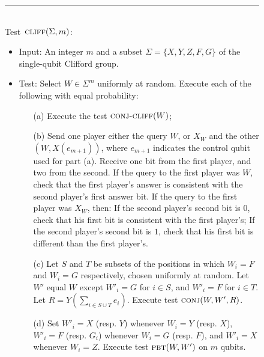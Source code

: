 \begin{figure}[H]
\rule[1ex]{\textwidth}{0.5pt}\\
Test~$\textsc{cliff}(\Sigma,m)$:
\begin{itemize}
    \item Input: An integer $m$ and a subset $\Sigma = \{X,Y,Z,F,G\}$ of the single-qubit Clifford group. 
    \item Test: Select $W \in \Sigma^m$ uniformly at random. Execute each of the following with equal probability:
\begin{enumerate}
\item[(a)] Execute the test $\textsc{conj-cliff}(W)$;
\item[(b)] Send one player either the query $W$, or $X_W$ and the other $(W,X(e_{m+1}))$, where $e_{m+1}$ indicates the control qubit used for part (a). Receive one bit from the first player, and two from the second. If the query to the first player was $W$, check that the first player's answer is consistent with the second player's first answer bit. If the query to the first player was $X_W$, then: If the second player's second bit is $0$, check that his first bit is consistent with the first player's; If the second player's second bit is $1$, check that his first bit is different than the first player's.
\item[(c)] Let $S$ and $T$ be subsets of the positions in which $W_i=F$ and $W_i=G$ respectively, chosen uniformly at random. Let $W'$ equal $W$ except $W'_i=G$ for $i\in S$, and $W'_i=F$ for $i\in T$. Let  $R = Y(\sum_{i\in S\cup T} e_i)$. Execute test $\textsc{conj}(W,W', R)$.
\item[(d)] Set $W'_i = X$ (resp. $Y$) whenever $W_i = Y$ (resp. $X$), $W'_i = F$ (resp. $G_i$) whenever $W_i = G$ (resp. $F$), and $W'_i = X$ whenever $W_i=Z$. Execute test $\textsc{pbt}(W,W')$ on $m$ qubits.



\end{enumerate}
\end{itemize}
\end{figure}
